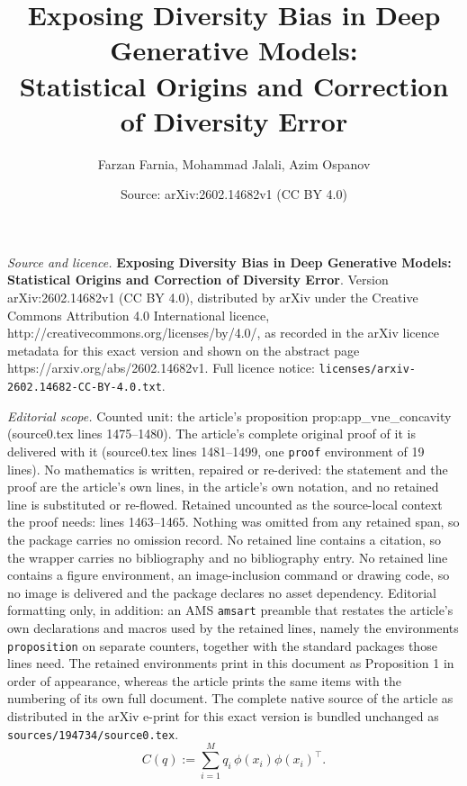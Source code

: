 \documentclass[10pt,a4paper]{amsart}
\title{\textbf{Exposing Diversity Bias in Deep Generative Models: \\ Statistical Origins and Correction of Diversity Error}}
\author{Farzan Farnia, Mohammad Jalali, Azim Ospanov}
\date{Source: arXiv:2602.14682v1 (CC BY 4.0)}
\begin{document}
\maketitle

\noindent\emph{Source and licence.} \textbf{Exposing Diversity Bias in Deep Generative Models: \\ Statistical Origins and Correction of Diversity Error}. Version arXiv:2602.14682v1 (CC BY 4.0), distributed by arXiv under the Creative Commons Attribution 4.0 International licence, http://creativecommons.org/licenses/by/4.0/, as recorded in the arXiv licence metadata for this exact version and shown on the abstract page https://arxiv.org/abs/2602.14682v1. Full licence notice: \texttt{licenses/arxiv-2602.14682-CC-BY-4.0.txt}.\par\smallskip

\noindent\textit{Editorial scope.} Counted unit: the article's proposition prop:app\_vne\_concavity (source0.tex lines 1475--1480). The article's complete original proof of it is delivered with it (source0.tex lines 1481--1499, one \texttt{proof} environment of 19 lines). No mathematics is written, repaired or re-derived: the statement and the proof are the article's own lines, in the article's own notation, and no retained line is substituted or re-flowed.  Retained uncounted as the source-local context the proof needs: lines 1463--1465.  Nothing was omitted from any retained span, so the package carries no omission record.  No retained line contains a citation, so the wrapper carries no bibliography and no bibliography entry.  No retained line contains a figure environment, an image-inclusion command or drawing code, so no image is delivered and the package declares no asset dependency.  Editorial formatting only, in addition: an AMS \texttt{amsart} preamble that restates the article's own declarations and macros used by the retained lines, namely the environments \texttt{proposition} on separate counters, together with the standard packages those lines need.  The retained environments print in this document as Proposition 1 in order of appearance, whereas the article prints the same items with the numbering of its own full document.  The complete native source of the article as distributed in the arXiv e-print for this exact version is bundled unchanged as \texttt{sources/194734/source0.tex}.
\begin{equation}\label{eq:app_cov_op}
C(q):=\sum_{i=1}^M q_i\,\phi(x_i)\phi(x_i)^\top.
\end{equation}
\end{document}
